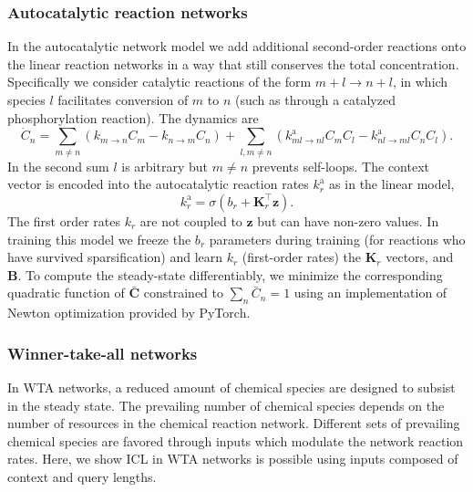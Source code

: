 \documentclass[%
reprint,
superscriptaddress,
amsmath,amssymb,
aps,
]{revtex4-2}
\begin{document}
\begin{onecolumngrid}
		\subsubsection{Autocatalytic reaction networks}\label{AutocatalyticModel}
		In the autocatalytic network model we add additional second-order reactions onto the linear reaction networks in a way that still conserves the total concentration.  Specifically we consider catalytic reactions of the form $m + l \rightarrow n + l$, in which species $l$ facilitates conversion of $m$ to $n$ (such as through a catalyzed phosphorylation reaction).  The dynamics are 
		\begin{equation}
			\dot{C}_n
			=
			\sum_{m\neq n}\left(
			k_{m\rightarrow n} C_m
			-
			k_{n\rightarrow m} C_n
			\right)
			+
			\sum_{l,m\neq n}
			\left(
			k^\text{a}_{ml\rightarrow nl} C_m C_l
			-
			k^\text{a}_{nl\rightarrow ml} C_n C_l
			\right).
			\label{eqautodyn}
		\end{equation}
		In the second sum $l$ is arbitrary but $m\neq n $ prevents self-loops.  The context vector is encoded into the autocatalytic reaction rates $k^\text{a}_r$ as in the linear model, 
		\begin{equation}
			k^\text{a}_r = \sigma(b_r +\mathbf{K}_r^\intercal\mathbf{z}).
		\end{equation}
		The first order rates $k_r$ are not coupled to $\mathbf{z}$ but can have non-zero values.  In training this model we freeze the $b_r$ parameters during training (for reactions who have survived sparsification) and learn $k_r$ (first-order rates) the $\mathbf{K}_r$ vectors, and $\mathbf{B}$.  To compute the steady-state differentiably, we minimize the corresponding quadratic function of $\bar{\mathbf{C}}$ constrained to $\sum_n \bar{C}_n = 1$ using an implementation of Newton optimization provided by PyTorch.  
		
		
		\subsubsection{Winner-take-all networks}\label{SIsec:WTAModel}
		In WTA networks, a reduced amount of chemical species are designed to subsist in the steady state. The prevailing number of chemical species depends on the number of resources in the chemical reaction network. Different sets of prevailing chemical species are favored through inputs which modulate the network reaction rates. Here, we show ICL in WTA networks is possible using inputs composed of context and query lengths.  
		

\end{onecolumngrid}
\end{document}
